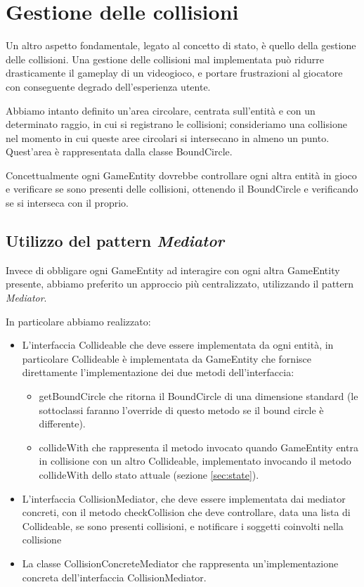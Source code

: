 \documentclass[a4paper,12pt]{article}
\begin{document}
\section{Gestione delle collisioni}
\label{sec:collisioni}

Un altro aspetto fondamentale, legato al concetto di stato, \`e quello della gestione delle collisioni. Una gestione delle collisioni mal implementata pu\`o ridurre drasticamente il gameplay di un videogioco, e portare frustrazioni al giocatore con conseguente degrado dell'esperienza utente.

Abbiamo intanto definito un'area circolare, centrata sull'entit\`a e con un determinato raggio, in cui si registrano le collisioni; consideriamo una collisione nel momento in cui queste aree circolari si intersecano in almeno un punto. Quest'area \`e rappresentata dalla classe \textsf{BoundCircle}.

Concettualmente ogni \textsf{GameEntity} dovrebbe controllare ogni altra entit\`a in gioco e verificare se sono presenti delle collisioni, ottenendo il \textsf{BoundCircle} e verificando se si interseca con il proprio.

\subsection{Utilizzo del pattern \emph{Mediator}}

Invece di obbligare ogni \textsf{GameEntity} ad interagire con ogni altra \textsf{GameEntity} presente, abbiamo preferito un approccio pi\`u centralizzato, utilizzando il pattern \emph{Mediator}.

In particolare abbiamo realizzato:
\begin{itemize}
\item L'interfaccia \textsf{Collideable} che deve essere implementata da ogni entit\`a, in particolare \textsf{Collideable} \`e implementata da \textsf{GameEntity} che fornisce direttamente l'implementazione dei due metodi dell'interfaccia:
\begin{itemize}
\item \textsf{getBoundCircle} che ritorna il \textsf{BoundCircle} di una dimensione standard (le sottoclassi faranno l'override di questo metodo se il bound circle \`e differente).
\item \textsf{collideWith} che rappresenta il metodo invocato quando \textsf{GameEntity} entra in collisione con un altro \textsf{Collideable}, implementato invocando il metodo \textsf{collideWith} dello stato attuale (sezione \ref{sec:state}).
\end{itemize}
\item L'interfaccia \textsf{CollisionMediator}, che deve essere implementata dai mediator concreti, con il metodo \textsf{checkCollision} che deve controllare, data una lista di \textsf{Collideable}, se sono presenti collisioni, e notificare i soggetti coinvolti nella collisione 
\item La classe \textsf{CollisionConcreteMediator} che rappresenta un'implementazione concreta dell'interfaccia \textsf{CollisionMediator}.
\end{itemize}
\end{document}
